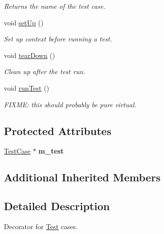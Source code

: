 \begin{DoxyCompactItemize}
\begin{DoxyCompactList}\small\item\em Returns the name of the test case. \end{DoxyCompactList}\item 
\hypertarget{class_test_case_decorator_ae379c8f3e6d411d8a5da57094c08a623}{void \hyperlink{class_test_case_decorator_ae379c8f3e6d411d8a5da57094c08a623}{set\+Up} ()}\label{class_test_case_decorator_ae379c8f3e6d411d8a5da57094c08a623}

\begin{DoxyCompactList}\small\item\em Set up context before running a test. \end{DoxyCompactList}\item 
\hypertarget{class_test_case_decorator_adc3ee82fb758f39b5781624090af449d}{void \hyperlink{class_test_case_decorator_adc3ee82fb758f39b5781624090af449d}{tear\+Down} ()}\label{class_test_case_decorator_adc3ee82fb758f39b5781624090af449d}

\begin{DoxyCompactList}\small\item\em Clean up after the test run. \end{DoxyCompactList}\item 
void \hyperlink{class_test_case_decorator_ad083ca55ff2e7f1f3f442364aa1dde66}{run\+Test} ()
\begin{DoxyCompactList}\small\item\em F\+I\+X\+M\+E\+: this should probably be pure virtual. \end{DoxyCompactList}\end{DoxyCompactItemize}
\subsection*{Protected Attributes}
\begin{DoxyCompactItemize}
\item 
\hypertarget{class_test_case_decorator_a7f8055eebe6cd064289c70a111f0edf1}{\hyperlink{class_test_case}{Test\+Case} $\ast$ {\bfseries m\+\_\+test}}\label{class_test_case_decorator_a7f8055eebe6cd064289c70a111f0edf1}

\end{DoxyCompactItemize}
\subsection*{Additional Inherited Members}


\subsection{Detailed Description}
Decorator for \hyperlink{class_test}{Test} cases. 

